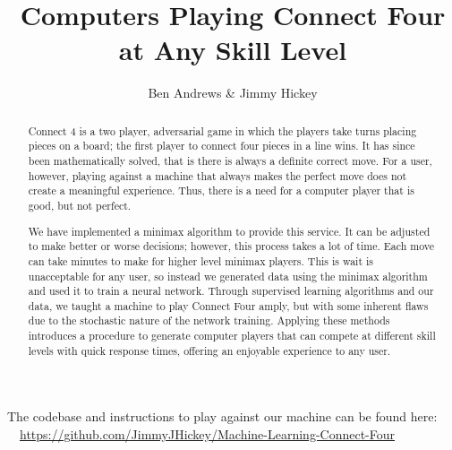 \documentclass[12pt]{article}
\title{Computers Playing Connect Four at Any Skill Level}
\author{Ben Andrews \& Jimmy Hickey}
\begin{document}
	\maketitle
		\doublespacing
\begin{abstract}

	Connect 4 is a two player, adversarial game in which the players take turns placing pieces on a board; the first player to connect four pieces in a line wins. It has since been mathematically solved, that is there is always a definite correct move. For a user, however, playing against a machine that always makes the perfect move does not create a meaningful experience. Thus, there is a need for a computer player that is good, but not perfect. 
	
	We have implemented a minimax algorithm to provide this service. It can be adjusted to make better or worse decisions; however, this process takes a lot of time. Each move can take minutes to make for higher level minimax players. This is wait is unacceptable for any user, so instead we generated data using the minimax algorithm and used it to train a neural network.
Through supervised learning algorithms and our data, we taught a machine to play Connect Four amply, but with some inherent flaws due to the stochastic nature of the network training. Applying these methods introduces a procedure to generate computer players that can compete at different skill levels with quick response times, offering an enjoyable experience to any user.
\end{abstract}
The codebase and instructions to play against our machine can be found here: \\
\faGithub \ \  \href{https://github.com/JimmyJHickey/Machine-Learning-Connect-Four}{https://github.com/JimmyJHickey/Machine-Learning-Connect-Four}
\end{document}
